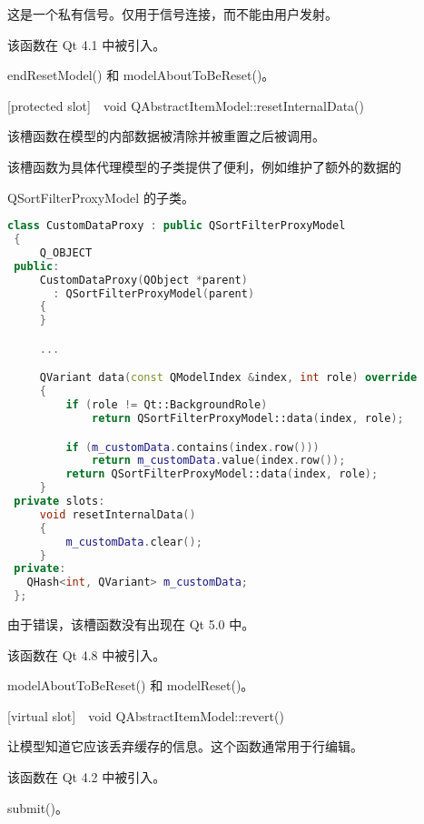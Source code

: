 \begin{notice}
这是一个私有信号。仅用于信号连接，而不能由用户发射。
\end{notice}

该函数在 Qt 4.1 中被引入。

\begin{seeAlso}
endResetModel() 和 modelAboutToBeReset()。
\end{seeAlso}

[protected slot] void QAbstractItemModel::resetInternalData()

该槽函数在模型的内部数据被清除并被重置之后被调用。

该槽函数为具体代理模型的子类提供了便利，例如维护了额外的数据的

QSortFilterProxyModel 的子类。

\begin{lstlisting}[language=C++]
 class CustomDataProxy : public QSortFilterProxyModel
 {
     Q_OBJECT
 public:
     CustomDataProxy(QObject *parent)
       : QSortFilterProxyModel(parent)
     {
     }

     ...

     QVariant data(const QModelIndex &index, int role) override
     {
         if (role != Qt::BackgroundRole)
             return QSortFilterProxyModel::data(index, role);

         if (m_customData.contains(index.row()))
             return m_customData.value(index.row());
         return QSortFilterProxyModel::data(index, role);
     }
 private slots:
     void resetInternalData()
     {
         m_customData.clear();
     }
 private:
   QHash<int, QVariant> m_customData;
 };
\end{lstlisting}

\begin{notice}
由于错误，该槽函数没有出现在 Qt 5.0 中。
\end{notice}

该函数在 Qt 4.8 中被引入。

\begin{seeAlso}
modelAboutToBeReset() 和 modelReset()。
\end{seeAlso}

[virtual slot] void QAbstractItemModel::revert()

让模型知道它应该丢弃缓存的信息。这个函数通常用于行编辑。

该函数在 Qt 4.2 中被引入。

\begin{seeAlso}
submit()。
\end{seeAlso}

